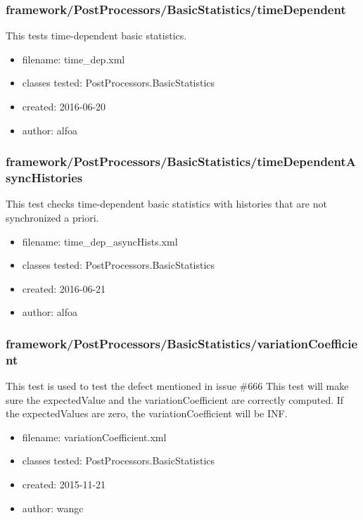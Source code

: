     \subsubsection{framework/PostProcessors/BasicStatistics/timeDependent}
      
      This tests time-dependent basic statistics.
    
      \begin{itemize}
          \item filename: time\_dep.xml
          \item classes tested: PostProcessors.BasicStatistics
          \item created: 2016-06-20
          \item author: alfoa
      \end{itemize}
    \subsubsection{framework/PostProcessors/BasicStatistics/timeDependentAsyncHistories}
      
      This test checks time-dependent basic statistics with histories that are not synchronized a priori.
    
      \begin{itemize}
          \item filename: time\_dep\_asyncHists.xml
          \item classes tested: PostProcessors.BasicStatistics
          \item created: 2016-06-21
          \item author: alfoa
      \end{itemize}
    \subsubsection{framework/PostProcessors/BasicStatistics/variationCoefficient}
      
			This test is used to test the defect mentioned in issue \#666
			This test will make sure the expectedValue and the variationCoefficient are correctly computed.
			If the expectedValues are zero, the variationCoefficient will be INF.
    
      \begin{itemize}
          \item filename: variationCoefficient.xml
          \item classes tested: PostProcessors.BasicStatistics
          \item created: 2015-11-21
          \item author: wangc
      \end{itemize}
